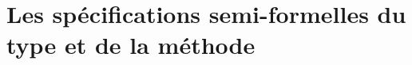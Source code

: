 
\chapter{Les spécifications semi-formelles du type  et de la
méthode }

\label{specification-reducer.ann}


